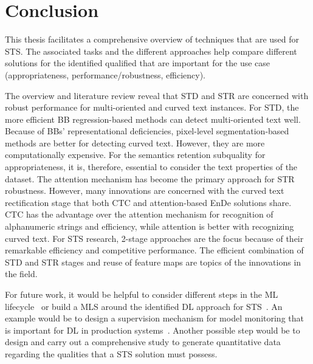 \chapter{Conclusion}
This thesis facilitates a comprehensive overview of techniques that are used for \ac{STS}.
The associated tasks and the different approaches help compare different
solutions for the identified qualified that are important for the use case
(appropriateness, performance/robustness, efficiency).

The overview and literature review reveal that \ac{STD} and \ac{STR} are concerned
with robust performance for multi-oriented and curved text instances.
For \ac{STD}, the more efficient \ac{BB} regression-based methods can detect multi-oriented text well.
Because of \acp{BB}' representational deficiencies, pixel-level segmentation-based methods are better for
detecting curved text.
However, they are more computationally expensive.
For the semantics retention subquality for appropriateness, it is, therefore, essential to consider
the text properties of the dataset.
The attention mechanism has become the primary approach for \ac{STR} robustness.
However, many innovations are concerned with the curved text rectification stage that both
\ac{CTC} and attention-based \ac{EnDe} solutions share.
\ac{CTC} has the advantage over the attention mechanism for recognition of alphanumeric strings
and efficiency, while attention is better with recognizing curved text.
For \ac{STS} research, 2-stage approaches are the focus because of their remarkable efficiency and
competitive performance.
The efficient combination of \ac{STD} and \ac{STR} stages and reuse of feature maps are topics
of the innovations in the field.

For future work, it would be helpful to consider different steps in the \ac{ML}
lifecycle~\citep{watanabe_preliminary_2019} or build a \ac{MLS} around the identified \ac{DL}
approach for \ac{STS}~\citep{siebert_construction_2021,nakamichi_requirements-driven_2020}.
An example would be to design a supervision mechanism for model monitoring that is important for
\ac{DL} in production systems~\cite{nakamichi_requirements-driven_2020,watanabe_preliminary_2019}.
Another possible step would be to design and carry out a comprehensive study to generate quantitative
data regarding the qualities that a \ac{STS} solution must possess.
